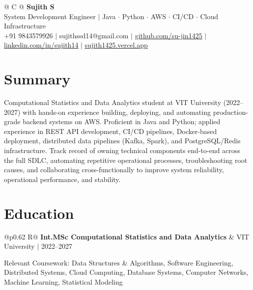 \documentclass[a4paper,10pt]{article}
\newcommand{\ulink}[2]{\href{#1}{\uline{#2}}}
\newcommand{\subheading}[1]{{\color[HTML]{0A0A0A}\fontsize{12}{14}\selectfont\bfseries #1}}
\newcommand{\meta}[1]{{\color[HTML]{5C5C5C}\fontsize{10.5}{12.5}\selectfont #1}}
\begin{document}
\pagestyle{empty}

\begin{tabularx}{\linewidth}{@{} C @{}}
{\color[HTML]{000000}\fontsize{30}{35}\selectfont\bfseries Sujith S} \\[5pt]
{\fontsize{10.5}{12.5}\selectfont\color[HTML]{3A3A3A}
System Development Engineer $|$ Java $\cdot$ Python $\cdot$ AWS $\cdot$ CI/CD $\cdot$ Cloud Infrastructure} \\[6pt]
{\fontsize{10.5}{12.5}\selectfont\textcolor[HTML]{3A3A3A}{
+91 9843579926 $|$
sujithssd14@gmail.com $|$
\ulink{https://github.com/su-jin1425}{github.com/su-jin1425} $|$
\ulink{https://linkedin.com/in/sujith14}{linkedin.com/in/sujith14} $|$
\ulink{https://sujith1425.vercel.app}{sujith1425.vercel.app}}}
\end{tabularx}

\vspace{2pt}

\section{Summary}
\vspace{2pt}
{\color[HTML]{0A0A0A}\fontsize{11}{14}\selectfont
Computational Statistics and Data Analytics student at VIT University (2022--2027) with hands-on experience building, deploying, and automating production-grade backend systems on AWS. Proficient in Java and Python; applied experience in REST API development, CI/CD pipelines, Docker-based deployment, distributed data pipelines (Kafka, Spark), and PostgreSQL/Redis infrastructure. Track record of owning technical components end-to-end across the full SDLC, automating repetitive operational processes, troubleshooting root causes, and collaborating cross-functionally to improve system reliability, operational performance, and stability.}

\vspace{2pt}

\section{Education}
\vspace{2pt}

\begin{tabularx}{\linewidth}{@{}p{0.62\linewidth} R@{}}
\subheading{Int.MSc Computational Statistics and Data Analytics} & \meta{VIT University $|$ 2022--2027}
\end{tabularx}
\vspace{2pt}
{\color[HTML]{3A3A3A}\fontsize{11}{14}\selectfont Relevant Coursework: Data Structures \& Algorithms, Software Engineering, Distributed Systems, Cloud Computing, Database Systems, Computer Networks, Machine Learning, Statistical Modeling}
\end{document}
